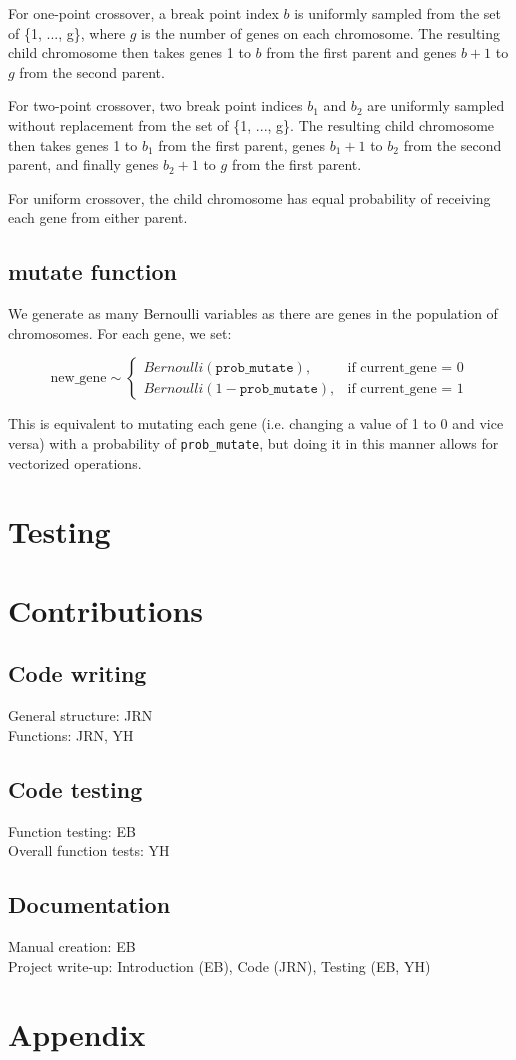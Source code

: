 \documentclass[11pt]{article}
\begin{document}
For one-point crossover, a break point index $b$ is uniformly sampled from the set of \{1, ..., g\}, where $g$ is the number of genes on each chromosome. The resulting child chromosome then takes genes 1 to $b$ from the first parent and genes $b+1$ to $g$ from the second parent.

For two-point crossover, two break point indices $b_1$ and $b_2$ are uniformly sampled without replacement from the set of \{1, ..., g\}. The resulting child chromosome then takes genes 1 to $b_1$ from the first parent, genes $b_1+1$ to $b_2$ from the second parent, and finally genes $b_2+1$ to $g$ from the first parent.

For uniform crossover, the child chromosome has equal probability of receiving each gene from either parent.

\subsection*{mutate function}
We generate as many Bernoulli variables as there are genes in the population of chromosomes. For each gene, we set:

\[
\text{new\_gene} \sim
\begin{cases}
Bernoulli(\texttt{prob\_mutate}), & \text{if current\_gene = 0}\\
Bernoulli(1-\texttt{prob\_mutate}), & \text{if current\_gene = 1}
\end{cases}
\]

This is equivalent to mutating each gene (i.e. changing a value of 1 to 0 and vice versa) with a probability of \texttt{prob\_mutate}, but doing it in this manner allows for vectorized operations.

\section{Testing} 

\section{Contributions} 
\label{sec:contributions}
\subsection{Code writing}
General structure: JRN\\
Functions: JRN, YH

\subsection{Code testing}
Function testing: EB\\
Overall function tests: YH

\subsection{Documentation}
Manual creation: EB\\
Project write-up: Introduction (EB), Code (JRN), Testing (EB, YH)

\section{Appendix}
\label{sec:appendix}

\end{document}
